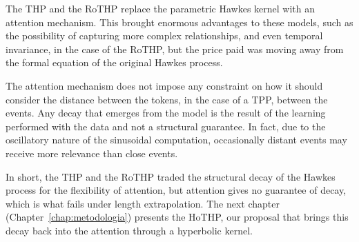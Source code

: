 The THP and the RoTHP replace the parametric Hawkes kernel with an attention mechanism. This brought enormous advantages to these models, such as the possibility of capturing more complex relationships, and even temporal invariance, in the case of the RoTHP, but the price paid was moving away from the formal equation of the original Hawkes process.

The attention mechanism does not impose any constraint on how it should consider the distance between the tokens, in the case of a TPP, between the events. Any decay that emerges from the model is the result of the learning performed with the data and not a structural guarantee. In fact, due to the oscillatory nature of the sinusoidal computation, occasionally distant events may receive more relevance than close events.

In short, the THP and the RoTHP traded the structural decay of the Hawkes process for the flexibility of attention, but attention gives no guarantee of decay, which is what fails under length extrapolation. The next chapter (Chapter~\ref{chap:metodologia}) presents the HoTHP, our proposal that brings this decay back into the attention through a hyperbolic kernel.

